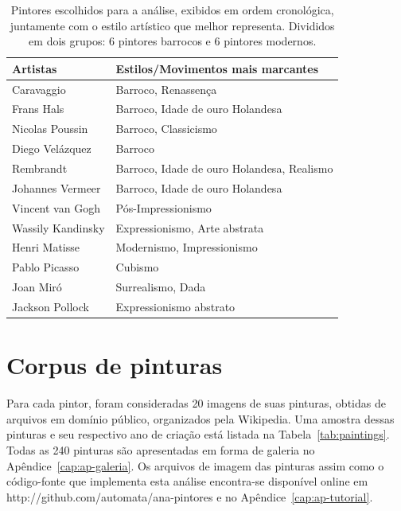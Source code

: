 \begin{table}
\begin{center}
\caption{\label{tab:painters} Pintores escolhidos para a análise, exibidos em
  ordem cronológica, juntamente com o estilo artístico que melhor
  representa. Divididos em dois grupos: 6 pintores barrocos e 6 pintores modernos.}

\begin{tabular}{l|l}
\hline

 Artistas                      & Estilos/Movimentos mais marcantes \\ 
 
 \hline

 Caravaggio                    & Barroco, Renassença \\
 Frans Hals                    & Barroco, Idade de ouro Holandesa \\
 Nicolas Poussin               & Barroco, Classicismo \\
 Diego Vel\'{a}zquez           & Barroco \\
 Rembrandt                     & Barroco, Idade de ouro Holandesa, Realismo \\
 Johannes Vermeer              & Barroco, Idade de ouro Holandesa \\
 
 \hline
 
 Vincent van Gogh              & Pós-Impressionismo \\
 Wassily Kandinsky             & Expressionismo, Arte abstrata \\
 Henri Matisse                 & Modernismo, Impressionismo \\
 Pablo Picasso                 & Cubismo \\
 Joan Mir\'{o}                 & Surrealismo, Dada \\
 Jackson Pollock               & Expressionismo abstrato \\

\hline
\end{tabular}
\end{center}
\end{table}


\section{Corpus de pinturas}

Para cada pintor, foram consideradas 20 imagens de suas pinturas, obtidas de
arquivos em domínio público, organizados pela Wikipedia. Uma amostra dessas
pinturas e seu respectivo ano de criação está listada na
Tabela~\ref{tab:paintings}. Todas as 240 pinturas são apresentadas em forma de
galeria no Apêndice~\ref{cap:ap-galeria}. Os arquivos de imagem das pinturas
  assim como o código-fonte que implementa esta análise encontra-se disponível
  online em http://github.com/automata/ana-pintores e no Apêndice~\ref{cap:ap-tutorial}.

